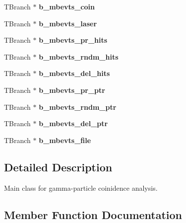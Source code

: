 \begin{DoxyCompactItemize}
T\+Branch $\ast$ {\bfseries b\+\_\+mbevts\+\_\+coin}
\item 
\mbox{\label{classg__clx_a654f79962aec1454c9e297b89f3a8beb}} 
T\+Branch $\ast$ {\bfseries b\+\_\+mbevts\+\_\+laser}
\item 
\mbox{\label{classg__clx_a8604c42bddbbf63ea8cf7f3e1af36cf3}} 
T\+Branch $\ast$ {\bfseries b\+\_\+mbevts\+\_\+pr\+\_\+hits}
\item 
\mbox{\label{classg__clx_a5a8055b0d581696cd84f6a4b5b4c582f}} 
T\+Branch $\ast$ {\bfseries b\+\_\+mbevts\+\_\+rndm\+\_\+hits}
\item 
\mbox{\label{classg__clx_ab7d9842b440289a2274a926e7611bb2c}} 
T\+Branch $\ast$ {\bfseries b\+\_\+mbevts\+\_\+del\+\_\+hits}
\item 
\mbox{\label{classg__clx_a9d647b0e87c194c34d426c949f610843}} 
T\+Branch $\ast$ {\bfseries b\+\_\+mbevts\+\_\+pr\+\_\+ptr}
\item 
\mbox{\label{classg__clx_a992d0d4203d4ab5327153a81f199942f}} 
T\+Branch $\ast$ {\bfseries b\+\_\+mbevts\+\_\+rndm\+\_\+ptr}
\item 
\mbox{\label{classg__clx_a30a5429830731f534a82e57fd7c6c589}} 
T\+Branch $\ast$ {\bfseries b\+\_\+mbevts\+\_\+del\+\_\+ptr}
\item 
\mbox{\label{classg__clx_a76bc22e5d25b02dd39e4b22369bbcb46}} 
T\+Branch $\ast$ {\bfseries b\+\_\+mbevts\+\_\+file}
\end{DoxyCompactItemize}


\subsection{Detailed Description}
Main class for gamma-\/particle coinidence analysis. 

\subsection{Member Function Documentation}
\mbox{\label{classg__clx_a92531261155ea15bee6b74c7e491132a}} 
